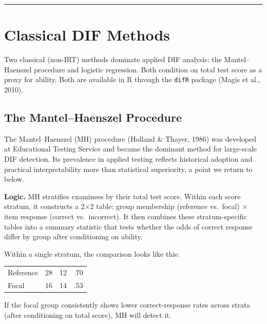 \documentclass[
  11pt,
  letterpaper,
]{scrbook}
\begin{document}
\begin{center}\rule{0.5\linewidth}{0.5pt}\end{center}

\section{Classical DIF Methods}\label{classical-dif-methods}

Two classical (non-IRT) methods dominate applied DIF analysis: the
Mantel--Haenszel procedure and logistic regression. Both condition on
total test score as a proxy for ability. Both are available in R through
the \texttt{difR} package (Magis et al., 2010).

\subsection{The Mantel--Haenszel
Procedure}\label{the-mantelhaenszel-procedure}

The Mantel--Haenszel (MH) procedure (Holland \& Thayer, 1986) was
developed at Educational Testing Service and became the dominant method
for large-scale DIF detection. Its prevalence in applied testing
reflects historical adoption and practical interpretability more than
statistical superiority, a point we return to below.

\textbf{Logic.} MH stratifies examinees by their total test score.
Within each score stratum, it constructs a 2×2 table: group membership
(reference vs.~focal) × item response (correct vs.~incorrect). It then
combines these stratum-specific tables into a summary statistic that
tests whether the odds of correct response differ by group after
conditioning on ability.

Within a single stratum, the comparison looks like this:

\begin{longtable*}[t]{lccc}
\toprule
{} &  &  & \\
\midrule
Reference & 28 & 12 & .70\\
Focal & 16 & 14 & .53\\
\bottomrule
\end{longtable*}

If the focal group consistently shows lower correct-response rates
across strata (after conditioning on total score), MH will detect it.
\end{document}
